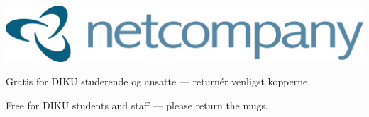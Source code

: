 \documentclass{article}
\begin{document}
\maketitle

\null
\vspace{-1.5cm}


\vspace{0.1in}

\begin{center}

\includegraphics[scale=1.1]{billeder/netcompany-logo.png}

\end{center}

\vspace{0.2in}

\begin{center}

\huge Gratis for DIKU studerende og ansatte --- returnér venligst kopperne.

\english

\huge Free for DIKU students and staff --- please return the mugs.

\end{center}

\dansk

\underskriv
\end{document}
